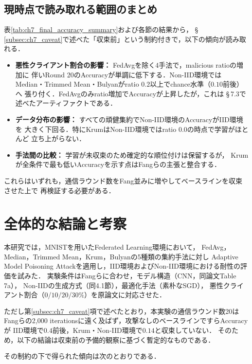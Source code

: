 \documentclass[a4j, twocolumn, dvipdfmx]{jsarticle}  %
\begin{document}
\subsection{現時点で読み取れる範囲のまとめ}

表\ref{tab:ch7_final_accuracy_summary}および各節の結果から，
\S\,\ref{subsec:ch7_caveat}で述べた「収束前」という制約付きで，以下の傾向が読み取れる．

\begin{itemize}
    \item \textbf{悪性クライアント割合の影響：} FedAvgを除く4手法で，malicious ratioの増加に
          伴いRound 20のAccuracyが単調に低下する．Non-IID環境では
          Median・Trimmed Mean・Bulyanがratio $0.2$以上でchance水準（$0.10$前後）へ
          張り付く．FedAvgのみratio増加でAccuracyが上昇したが，これは
          \S\,7.3で述べたアーティファクトである．
    \item \textbf{データ分布の影響：} すべての頑健集約でNon-IID環境のAccuracyがIID環境を
          大きく下回る．特にKrumはNon-IID環境ではratio $0.0$の時点で学習がほとんど
          立ち上がらない．
    \item \textbf{手法間の比較：} 学習が未収束のため確定的な順位付けは保留するが，
          Krumが全条件で最も低いAccuracyを示す点はFangらの主張と整合する．
\end{itemize}

これらはいずれも，通信ラウンド数をFang並みに増やしてベースラインを収束させた上で
再検証する必要がある．


\section{全体的な結論と考察}

本研究では，MNISTを用いたFederated Learning環境において，
FedAvg，Median，Trimmed Mean，Krum，Bulyanの5種類の集約手法に対し
Adaptive Model Poisoning Attackを適用し，IID環境およびNon-IID環境における耐性の評価を試みた．
実験条件はFangら\cite{fang2020local}に合わせ，モデル構造（CNN，同論文Table 7a），
Non-IIDの生成方式（同4.1節），最適化手法（素朴なSGD），
悪性クライアント割合（$0$/$10$/$20$/$30$\%）を原論文に対応させた．

ただし第\ref{subsec:ch7_caveat}項で述べたとおり，本実験の通信ラウンド数20は
Fangらの2{,}000 iterationsに遠く及ばず，攻撃なしのベースラインですらAccuracyが
IID環境で$0.4$前後，Krum・Non-IID環境で$0.14$と収束していない．
そのため，以下の結論は収束前の予備的観察に基づく暫定的なものである．

その制約の下で得られた傾向は次のとおりである．
\end{document}
